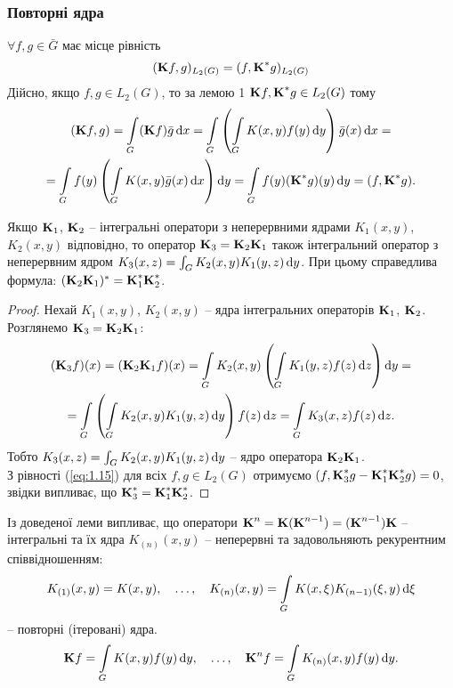 \subsubsection*{Повторні ядра}

$\forall f, g \in \bar G$ має місце рівність 
\begin{equation}
	\label{eq:1.15}
	(\bf{K}f,g)_{L_2(G)} = (f, \bf{K}^*g)_{L_2(G)}
\end{equation}
Дійсно, якщо $f, g \in L_2(G)$, то за лемою 1 $\bf{K}f, \bf{K}^*g \in L_2(G)$ тому
\begin{multline*}
	(\bf{K}f, g) = \Int_G (\bf{K}f)\bar g \diff x = \Int_G \left( \Int_G K(x, y) f(y) \diff y\right) \bar g(x) \diff x = \\
	= \Int_G f(y) \left( \Int_G K(x, y) \bar g(x) \diff x\right) \diff y = \Int_G f(y) (\bf{K}^* g)(y) \diff y = (f, \bf{K}^*g).
\end{multline*}

\begin{lemma}
	Якщо $\bf{K}_1$, $\bf{K}_2$ -- інтегральні оператори з неперервними ядрами $K_1(x, y)$, $K_2(x, y)$ відповідно, то оператор $\bf{K}_3 = \bf{K}_2 \bf{K}_1$ також інтегральний оператор з неперервним ядром $K_3(x, z) = \int_G K_2(x, y) K_1(y, z) \diff y$. При цьому справедлива формула: $(\bf{K}_2\bf{K}_1)^* = \bf{K}_1^* \bf{K}_2^*$.
\end{lemma}
\begin{proof}
	Нехай $K_1(x, y)$, $K_2(x, y)$ -- ядра інтегральних операторів $\bf{K}_1$, $\bf{K}_2$. Розглянемо $\bf{K}_3 = \bf{K}_2 \bf{K}_1$:
	\begin{multline*}
		(\bf{K}_3 f)(x) = (\bf{K}_2\bf{K}_1f)(x) = \Int_G K_2(x, y) \left( \Int_G K_1(y, z) f(z) \diff z \right) \diff y = \\
		= \Int_G \left( \Int_G K_2(x, y) K_1(y, z) \diff y\right) f(z) \diff z = \Int_G K_3(x, z) f(z) \diff z.
	\end{multline*}
	Тобто $K_3(x, z) = \int_G K_2(x, y) K_1(y, z) \diff y$ -- ядро оператора $\bf{K}_2\bf{K}_1$. \\

	З рівності (\ref{eq:1.15}) для всіх $f, g \in L_2(G)$ отримуємо $(f, \bf{K}_3^*g - \bf{K}_1^* \bf{K}_2^* g) = 0$, звідки випливає, що $\bf{K}_3^* = \bf{K}_1^* \bf{K}_2^*$.
\end{proof}

Із доведеної леми випливає, що оператори $\bf{K}^n = \bf{K} (\bf{K}^{n - 1}) = (\bf{K}^{n - 1})\bf{K}$ -- інтегральні та їх ядра $K_{(n)}(x, y)$ -- неперервні та задовольняють рекурентним співвідношенням:
\begin{equation}
	\label{eq:1.16}
	K_{(1)}(x, y) = K(x, y), \quad \ldots, \quad K_{(n)}(x, y) = \Int_G K(x, \xi) K_{(n - 1)}(\xi, y) \diff \xi
\end{equation}
-- повторні (ітеровані) ядра.
\[ \bf{K}f = \Int_G K(x, y) f(y) \diff y, \quad \ldots, \quad \bf{K}^n f = \Int_G K_{(n)}(x, y)f(y) \diff y. \]

